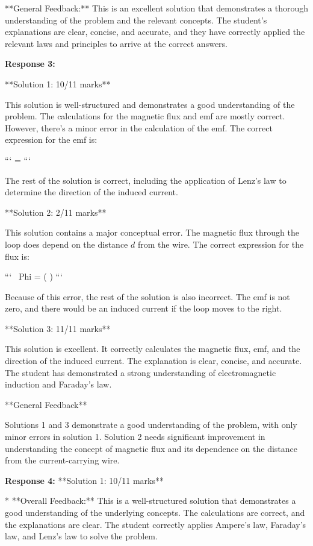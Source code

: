 \documentclass[a4paper,11pt]{article}
\begin{document}
**General Feedback:** This is an excellent solution that demonstrates a thorough understanding of the problem and the relevant concepts. The student's explanations are clear, concise, and accurate, and they have correctly applied the relevant laws and principles to arrive at the correct answers.


\textbf{Response 3:}

**Solution 1: 10/11 marks**

This solution is well-structured and demonstrates a good understanding of the problem. The calculations for the magnetic flux and emf are mostly correct. However, there's a minor error in the calculation of the emf. The correct expression for the emf is:

```
 = 
```

The rest of the solution is correct, including the application of Lenz's law to determine the direction of the induced current.

**Solution 2: 2/11 marks**

This solution contains a major conceptual error. The magnetic flux through the loop does depend on the distance \( d \) from the wire. The correct expression for the flux is:

```
\ Phi = \ln (  )
```

Because of this error, the rest of the solution is also incorrect. The emf is not zero, and there would be an induced current if the loop moves to the right.

**Solution 3: 11/11 marks**

This solution is excellent. It correctly calculates the magnetic flux, emf, and the direction of the induced current. The explanation is clear, concise, and accurate. The student has demonstrated a strong understanding of electromagnetic induction and Faraday's law.

**General Feedback**

Solutions 1 and 3 demonstrate a good understanding of the problem, with only minor errors in solution 1. Solution 2 needs significant improvement in understanding the concept of magnetic flux and its dependence on the distance from the current-carrying wire.

\textbf{Response 4:}
**Solution 1: 10/11 marks**

* **Overall Feedback:** This is a well-structured solution that demonstrates a good understanding of the underlying concepts. The calculations are correct, and the explanations are clear. The student correctly applies Ampere's law, Faraday's law, and Lenz's law to solve the problem.
\end{document}
